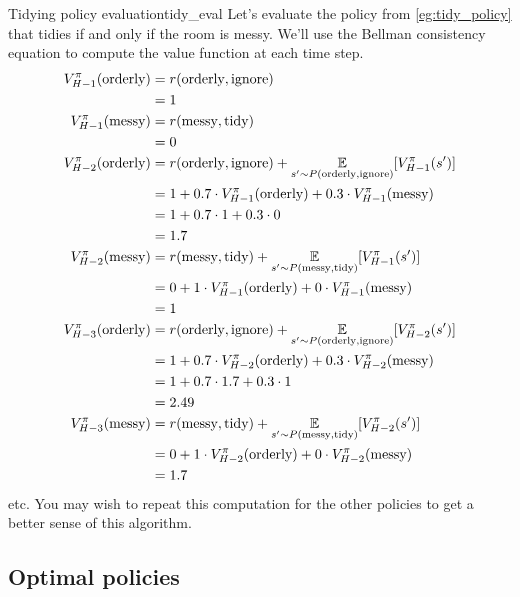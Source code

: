 \documentclass[../main/main]{subfiles}
\begin{document}
\begin{example}{Tidying policy evaluation}{tidy_eval}
    Let's evaluate the policy from \ref{eg:tidy_policy} that tidies if and only if the room is messy. We'll use the Bellman consistency equation to compute the value function at each time step.
    \begin{align*}
        V_{H-1}^\pi(\text{orderly}) &= r(\text{orderly}, \text{ignore}) \\
        &= 1 \\
        V_{H-1}^\pi(\text{messy}) &= r(\text{messy}, \text{tidy}) \\
        &= 0 \\
        V_{H-2}^\pi(\text{orderly}) &= r(\text{orderly}, \text{ignore}) + \operatorname*{\mathbb{E}}_{s' \sim P(\text{orderly}, \text{ignore})} [V_{H-1}^\pi(s')] \\
        &= 1 + 0.7 \cdot V_{H-1}^{\pi}(\text{orderly}) + 0.3 \cdot V_{H-1}^{\pi}(\text{messy}) \\
        &= 1 + 0.7 \cdot 1 + 0.3 \cdot 0 \\
        &= 1.7 \\
        V_{H-2}^\pi(\text{messy}) &= r(\text{messy}, \text{tidy}) + \operatorname*{\mathbb{E}}_{s' \sim P(\text{messy}, \text{tidy})} [V_{H-1}^\pi(s')] \\
        &= 0 + 1 \cdot V_{H-1}^{\pi}(\text{orderly}) + 0 \cdot V_{H-1}^{\pi}(\text{messy}) \\
        &= 1 \\
        V_{H-3}^\pi(\text{orderly}) &= r(\text{orderly}, \text{ignore}) + \operatorname*{\mathbb{E}}_{s' \sim P(\text{orderly}, \text{ignore})} [V_{H-2}^\pi(s')] \\
        &= 1 + 0.7 \cdot V_{H-2}^{\pi}(\text{orderly}) + 0.3 \cdot V_{H-2}^{\pi}(\text{messy}) \\
        &= 1 + 0.7 \cdot 1.7 + 0.3 \cdot 1 \\
        &= 2.49 \\
        V_{H-3}^\pi(\text{messy}) &= r(\text{messy}, \text{tidy}) + \operatorname*{\mathbb{E}}_{s' \sim P(\text{messy}, \text{tidy})} [V_{H-2}^\pi(s')] \\
        &= 0 + 1 \cdot V_{H-2}^{\pi}(\text{orderly}) + 0 \cdot V_{H-2}^{\pi}(\text{messy}) \\
        &= 1.7
    \end{align*}
    etc. You may wish to repeat this computation for the other policies to get a better sense of this algorithm.
\end{example}

\subsection{Optimal policies}
\end{document}
